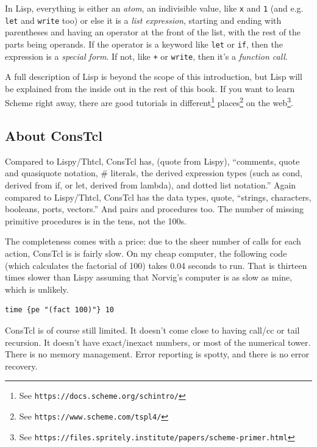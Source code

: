 \documentclass[twoside]{report}
\begin{document}
In Lisp, everything is either an \emph{atom}, an indivisible value, like
\texttt{x} and \texttt{1} (and e.g. \texttt{let} and \texttt{write} too) or
else it is a \emph{list expression}, starting and ending with parentheses and
having an operator at the front of the list, with the rest of the parts being
operands. If the operator is a keyword like \texttt{let} or \texttt{if}, then
the expression is a \emph{special form}. If not, like \texttt{+} or
\texttt{write}, then it's a \emph{function call}.

A full description of Lisp is beyond the scope of this introduction, but Lisp
will be explained from the inside out in the rest of this book. If you want to
learn Scheme right away, there are good tutorials in
different\footnote{See \texttt{https://docs.scheme.org/schintro/}}
places\footnote{See \texttt{https://www.scheme.com/tspl4/}} on the
web\footnote{See
\texttt{https://files.spritely.institute/papers/scheme-primer.html}}.

\subsection{About ConsTcl}
\label{about-constcl}

Compared to Lispy/Thtcl, ConsTcl has, (quote from Lispy), ``comments, quote and
quasiquote notation, \# literals, the derived expression types (such as cond,
derived from if, or let, derived from lambda), and dotted list notation.''
Again compared to Lispy/Thtcl, ConsTcl has the data types, quote, ``strings,
characters, booleans, ports, vectors.'' And pairs and procedures too. The
number of missing primitive procedures is in the tens, not the 100s. 

The completeness comes with a price: due to the sheer number of calls for each
action, ConsTcl is is fairly slow. On my cheap computer, the following code
(which calculates the factorial of 100) takes 0.04 seconds to run. That is thirteen
times slower than Lispy assuming that Norvig's computer is as slow as mine,
which is unlikely.

\begin{verbatim}
time {pe "(fact 100)"} 10
\end{verbatim}

ConsTcl is of course still limited. It doesn't come close to having call/cc or
tail recursion. It doesn't have exact/inexact numbers, or most of the numerical
tower. There is no memory management. Error reporting is spotty, and there is no
error recovery.
\end{document}

